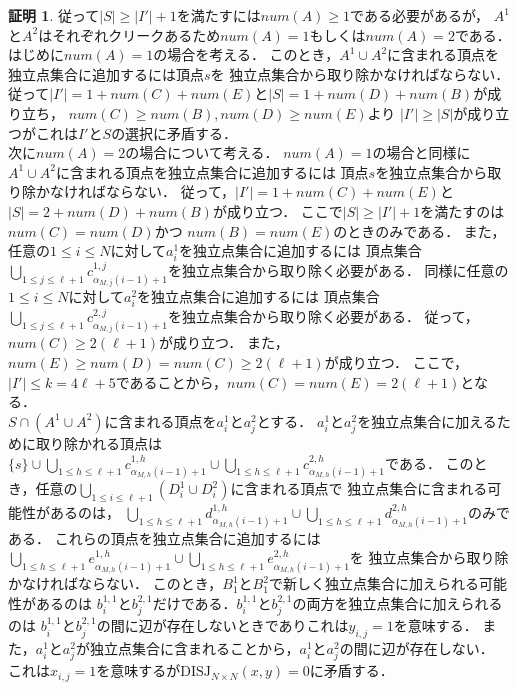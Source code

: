 \documentclass[12pt]{thesis}
\theoremstyle{definition}
\newtheorem*{prf*}{証明}
\begin{document}
\begin{prf*}
従って$|S|\geq |I'|+1$を満たすには$\mathit{num}(A) \geq 1$である必要があるが，
$A^{1}$と$A^{2}$はそれぞれクリークあるため$\mathit{num}(A) = 1$もしくは$\mathit{num}(A) = 2$である．\\
はじめに$\mathit{num}(A)=1$の場合を考える．
このとき，$A^{1} \cup A^{2}$に含まれる頂点を独立点集合に追加するには頂点$s$を
独立点集合から取り除かなければならない．
従って$|I'|=1+\mathit{num}(C)+\mathit{num}(E)$と$|S|=1+\mathit{num}(D)+\mathit{num}(B)$が成り立ち，
$\mathit{num}(C)\geq \mathit{num}(B), \mathit{num}(D)\geq \mathit{num}(E)$より
$|I'|\geq |S|$が成り立つがこれは$I'$と$S$の選択に矛盾する．\\
次に$\mathit{num}(A)=2$の場合について考える．
$\mathit{num}(A)=1$の場合と同様に$A^{1} \cup A^{2}$に含まれる頂点を独立点集合に追加するには
頂点$s$を独立点集合から取り除かなければならない．
従って，$|I'|=1+\mathit{num}(C)+\mathit{num}(E)$と$|S|=2+\mathit{num}(D)+\mathit{num}(B)$が成り立つ．
ここで$|S| \geq |I'|+1$を満たすのは$\mathit{num}(C)=\mathit{num}(D)$かつ
$\mathit{num}(B)=\mathit{num}(E)$のときのみである．
また，任意の$1\leq i \leq N$に対して$a^{1}_{i}$を独立点集合に追加するには
頂点集合$\bigcup_{1\leq j \leq \ell+1} c^{1,j}_{\alpha_{M,j}(i-1)+1}$を独立点集合から取り除く必要がある．
同様に任意の$1\leq i \leq N$に対して$a^{2}_{i}$を独立点集合に追加するには
頂点集合$\bigcup_{1\leq j \leq \ell+1} c^{2,j}_{\alpha_{M,j}(i-1)+1}$を独立点集合から取り除く必要がある．
従って，$\mathit{num}(C) \geq 2 (\ell+1)$が成り立つ．
また，$\mathit{num}(E)\geq \mathit{num}(D)=\mathit{num}(C) \geq 2(\ell+1)$が成り立つ．
ここで，$|I'|\leq k=4\ell+5$であることから，$\mathit{num}(C)=\mathit{num}(E)=2(\ell+1)$となる． \\
$S \cap (A^{1}\cup A^{2})$に含まれる頂点を$a^{1}_{i}$と$a^{2}_{j}$とする．
$a^{1}_{i}$と$a^{2}_{j}$を独立点集合に加えるために取り除かれる頂点は
$\{s\} \cup \bigcup_{1\leq h \leq \ell+1} c^{1,h}_{\alpha_{M,h}(i-1)+1} \cup 
\bigcup_{1\leq h \leq \ell+1} c^{2,h}_{\alpha_{M,h}(i-1)+1}$である．
このとき，任意の$\bigcup_{1 \leq i \leq \ell+1}(D^{1}_{i}\cup D^{2}_{i})$に含まれる頂点で
独立点集合に含まれる可能性があるのは，
$\bigcup_{1\leq h \leq \ell+1} d^{1,h}_{\alpha_{M,h}(i-1)+1}\cup 
\bigcup_{1\leq h \leq \ell+1} d^{2,h}_{\alpha_{M,h}(i-1)+1}$のみである．
これらの頂点を独立点集合に追加するには
$\bigcup_{1\leq h \leq \ell+1} e^{1,h}_{\alpha_{M,h}(i-1)+1}\cup 
\bigcup_{1\leq h \leq \ell+1} e^{2,h}_{\alpha_{M,h}(i-1)+1}$を
独立点集合から取り除かなければならない．
このとき，$B^{1}_{1}$と$B^{2}_{1}$で新しく独立点集合に加えられる可能性があるのは
$b^{1,1}_{i}$と$b^{2,1}_{j}$だけである．$b^{1,1}_{i}$と$b^{2,1}_{j}$の両方を独立点集合に加えられるのは
$b^{1,1}_{i}$と$b^{2,1}_{j}$の間に辺が存在しないときでありこれは$y_{i,j}=1$を意味する．
また，$a^{1}_{i}$と$a^{2}_{j}$が独立点集合に含まれることから，$a^{1}_{i}$と$a^{2}_{j}$の間に辺が存在しない．
これは$x_{i,j}=1$を意味するが$\mathrm{DISJ}_{N\times N}(x,y)=0$に矛盾する．


\end{prf*}
\end{document}
